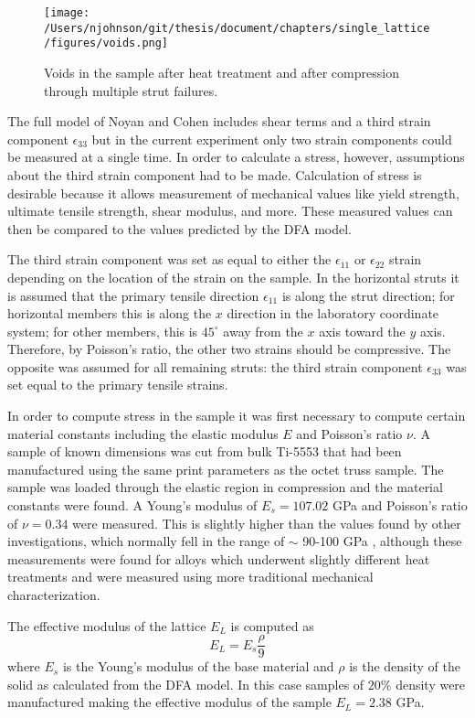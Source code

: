 \begin{figure*}[t]
	\texttt{[image: /Users/njohnson/git/thesis/document/chapters/single\_lattice/figures/voids.png]}
	\caption{Voids in the sample after heat treatment and after compression through multiple strut failures.}
	\label{voids}
\end{figure*}

The full model of Noyan and Cohen includes shear terms and a third strain component $\epsilon_{33}$ but in the current experiment only two strain components could be measured at a single time. In order to calculate a stress, however, assumptions about the third strain component had to be made. Calculation of stress is desirable because it allows measurement of mechanical values like yield strength, ultimate tensile strength, shear modulus, and more. These measured values can then be compared to the values predicted by the DFA model.

The third strain component was set as equal to either the $\epsilon_{11}$ or $\epsilon_{22}$ strain depending on the location of the strain on the sample. In the horizontal struts it is assumed that the primary tensile direction $\epsilon_{11}$ is along the strut direction; for horizontal members this is along the $x$ direction in the laboratory coordinate system; for other members, this is $45^\circ$ away from the $x$ axis toward the $y$ axis. Therefore, by Poisson's ratio, the other two strains should be compressive. The opposite was assumed for all remaining struts: the third strain component $\epsilon_{33}$ was set equal to the primary tensile strains.

In order to compute stress in the sample it was first necessary to compute certain material constants including the elastic modulus $E$ and Poisson's ratio $\nu$. A sample of known dimensions was cut from bulk Ti-5553 that had been manufactured using the same print parameters as the octet truss sample. The sample was loaded through the elastic region in compression and the material constants were found. A Young's modulus of $E_s = 107.02$ GPa and Poisson's ratio of $\nu = 0.34$ were measured. This is slightly higher than the values found by other investigations, which normally fell in the range of $\sim$ 90-100 GPa \cite{Clement2010}, although these measurements were found for alloys which underwent slightly different heat treatments and were measured using more traditional mechanical characterization.

The effective modulus of the lattice $E_L$ is computed as
\begin{equation}
	E_L = E_s \frac{\rho}{9}
	\label{effmod}
\end{equation}
where $E_s$ is the Young's modulus of the base material and $\rho$ is the density of the solid as calculated from the DFA model. In this case samples of $20\%$ density were manufactured making the effective modulus of the sample $E_L = 2.38$ GPa.

